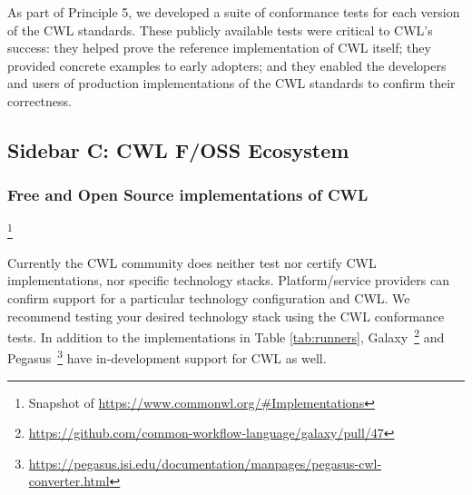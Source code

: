 \documentclass[sigconf,authordraft]{acmart}
\begin{document}
As part of Principle 5, we developed a suite of conformance tests for each version of the CWL standards. These publicly available tests were critical to CWL's success: they helped prove the reference implementation of CWL itself; they provided concrete examples to early adopters; and they enabled the developers and users of production implementations of the CWL standards to confirm their correctness.

\subsection{Sidebar C: CWL F/OSS Ecosystem}

\subsubsection{Free and Open Source implementations of CWL}\footnote{Snapshot of \url{https://www.commonwl.org/\#Implementations}}

Currently the CWL community does neither test nor certify CWL implementations, nor specific technology stacks. Platform/service providers can confirm support for a particular technology configuration and CWL. We recommend testing your desired technology stack using the CWL conformance tests. In addition to the implementations in Table \ref{tab:runners}, Galaxy~\cite{afgan_galaxy_2018}\footnote{\url{https://github.com/common-workflow-language/galaxy/pull/47}} and Pegasus~\cite{deelman_pegasus_2015}\footnote{\url{https://pegasus.isi.edu/documentation/manpages/pegasus-cwl-converter.html}} have in-development support for CWL as well.
\end{document}
